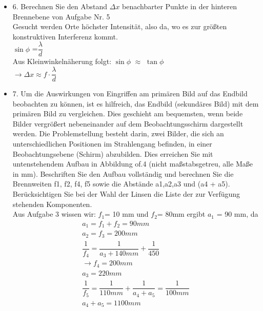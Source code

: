 \begin{itemize}
	\item 6. Berechnen Sie den Abstand $\Delta x$ benachbarter Punkte in der hinteren Brennebene von Aufgabe
	Nr. 5\\
	Gesucht werden Orte höchster Intensität, also da, wo es zur größten konstruktiven Interferenz kommt.\\
	$\sin\phi$ =$\dfrac{\lambda}{d}$\\
	Aus Kleinwinkelnäherung folgt: 
	$\sin\phi$ $\approx$ $\tan\phi$ \\
	$\rightarrow \Delta x \approx f \cdot \dfrac{\lambda}{d}$
	
	
	\item 7. Um die Auswirkungen von Eingriffen am primären Bild auf das Endbild beobachten zu können,
	ist es hilfreich, das Endbild (sekundäres Bild) mit dem primären Bild zu vergleichen.
	Dies geschieht am bequemsten, wenn beide Bilder vergrößert nebeneinander auf dem Beobachtungsschirm
	dargestellt werden. Die Problemstellung besteht darin, zwei Bilder, die sich an
	unterschiedlichen Positionen im Strahlengang befinden, in einer Beobachtungsebene (Schirm)
	abzubilden. Dies erreichen Sie mit untenstehendem Aufbau in Abbildung of.4 (nicht maßstabsgetreu,
	alle Maße in mm). Beschriften Sie den Aufbau vollständig und berechnen Sie die Brennweiten
	f1, f2, f4, f5 sowie die Abstände a1,a2,a3 und (a4 + a5). Berücksichtigen Sie bei der
	Wahl der Linsen die Liste der zur Verfügung stehenden Komponenten.\\
	Aus Aufgabe 3 wissen wir: $f_1$= 10 mm und $f_2$= 80mm ergibt $a_1$ = 90 mm, da
	\begin{align*}
a_1 = f_1 + f_2 = 90mm\\
a_2 = f_3 = 200mm\\
\dfrac{1}{f_4}=\dfrac{1}{a_3 + 140mm}+\dfrac{1}{450}\\
\rightarrow f_4 = 200 mm\\
a_3 = 220 mm\\
\dfrac{1}{f_5}=\dfrac{1}{110mm} + \dfrac{1}{a_4+a_5}=\dfrac{1}{100mm}\\
a_4+a_5=1100 mm
	\end{align*}
		\\\\\\\\\\\\\\\\\\\\\\\\\\\\\\\\\\\\\\\

\end{itemize}
